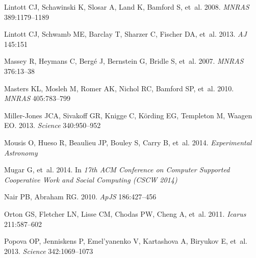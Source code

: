 \documentclass{ar2e}
\def\apjs{ApJS}
\def\mnras{MNRAS}
\def\aj{AJ}
\begin{document}
\begin{thebibliography}{}
{Lintott} CJ, {Schawinski} K, {Slosar} A, {Land} K, {Bamford} S, et~al. 2008.
\newblock \textit{\mnras} 389:1179--1189

{Lintott} CJ, {Schwamb} ME, {Barclay} T, {Sharzer} C, {Fischer} DA, et~al.
  2013.
\newblock \textit{\aj} 145:151

{Massey} R, {Heymans} C, {Berg{\'e}} J, {Bernstein} G, {Bridle} S, et~al. 2007.
\newblock \textit{\mnras} 376:13--38

{Masters} KL, {Mosleh} M, {Romer} AK, {Nichol} RC, {Bamford} SP, et~al. 2010.
\newblock \textit{\mnras} 405:783--799

{Miller-Jones} JCA, {Sivakoff} GR, {Knigge} C, {K{\"o}rding} EG, {Templeton} M,
  {Waagen} EO. 2013.
\newblock \textit{Science} 340:950--952

{Mousis} O, {Hueso} R, {Beaulieu} JP, {Bouley} S, {Carry} B, et~al. 2014.
\newblock \textit{Experimental Astronomy}

{Mugar} G, {et~al}. 2014.
\newblock In \textit{17th ACM Conference on Computer Supported Cooperative Work
  and Social Computing (CSCW 2014)}

{Nair} PB, {Abraham} RG. 2010.
\newblock \textit{\apjs} 186:427--456

Orton GS, Fletcher LN, Lisse CM, Chodas PW, Cheng A, et~al. 2011.
\newblock \textit{Icarus} 211:587--602

{Popova} OP, {Jenniskens} P, {Emel'yanenko} V, {Kartashova} A, {Biryukov} E,
  et~al. 2013.
\newblock \textit{Science} 342:1069--1073


\end{thebibliography}
\end{document}
